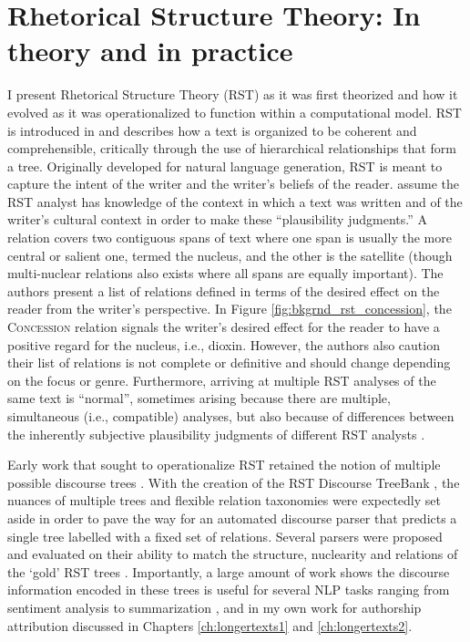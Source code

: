 
\section{Rhetorical Structure Theory: In theory and in practice}
I present Rhetorical Structure Theory (RST) as it was first theorized and how it evolved as it was operationalized to function within a computational model.  RST is introduced in \citet{Mann:1987} and describes how a text is organized to be coherent and comprehensible, critically through the use of hierarchical relationships that form a tree. Originally developed for natural language generation, RST is meant to capture the intent of the writer and the writer's beliefs of the reader. \citeauthor{Mann:1988} assume the RST analyst has knowledge of the context in which a text was written and of the writer's cultural context in order to make these ``plausibility judgments.'' A relation covers two contiguous spans of text where one span is usually the more central or salient one, termed the nucleus, and the other is the satellite (though multi-nuclear relations also exists where all spans are equally important). The authors present a list of relations defined in terms of the desired effect on the reader from the writer's perspective. In Figure \ref{fig:bkgrnd_rst_concession}, the \textsc{Concession} relation signals the writer's desired effect for the reader to have a positive regard for the nucleus, i.e., dioxin. However, the authors also caution their list of relations is not complete or definitive and should change depending on the focus or genre. Furthermore, arriving at multiple RST analyses of the same text is ``normal'', sometimes arising because there are multiple, simultaneous (i.e., compatible) analyses, but also because of differences between the inherently subjective plausibility judgments of different RST analysts \cite{Mann:1992}.  

Early work that sought to operationalize RST retained the notion of multiple possible discourse trees \cite{Marcu:1996}. With the creation of the RST Discourse TreeBank \cite{Carlson:2001}, the nuances of multiple trees and flexible relation taxonomies were expectedly set aside in order to pave the way for an automated discourse parser that predicts a single tree labelled with a fixed set of relations. Several parsers were proposed and evaluated on their ability to match the structure, nuclearity and relations of the `gold' RST trees \cite{Feng:2014,Ji:2014}. Importantly, a large amount of work shows the discourse information encoded in these trees is useful for several NLP tasks ranging from sentiment analysis \cite{Ji:2017} to summarization \cite{Durrett:2016,Xu:2020}, and in my own work for authorship attribution  discussed in Chapters \ref{ch:longertexts1} and \ref{ch:longertexts2}. 


